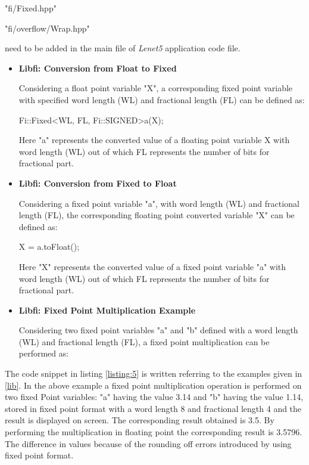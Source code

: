 \noindent "fi/Fixed.hpp"

\noindent "fi/overflow/Wrap.hpp"

\noindent need to be added in the main file of \textit{Lenet5} application code file.
\begin{itemize}
\item
\textbf{Libfi: Conversion from Float to Fixed}

\noindent Considering a float point variable "X", a corresponding fixed point variable with specified word length (WL) and fractional length (FL) can be defined as:

\hspace{3cm}Fi::Fixed\textless WL, FL, Fi::SIGNED\textgreater a(X);

\noindent Here "a" represents the converted value of a floating point variable X with word length (WL) out of which FL represents the number of bits for fractional part.
\item
\textbf{Libfi: Conversion from Fixed to Float}

\noindent Considering a fixed point variable "a", with word length (WL) and fractional length (FL), the corresponding floating point converted variable "X" can be defined as:

\hspace{3cm}X = a.toFloat();

\noindent Here "X" represents the converted value of a fixed point variable "a" with word length (WL) out of which FL represents the number of bits for fractional part.
\item
\textbf{Libfi: Fixed Point Multiplication Example}

\noindent Considering two fixed point variables "a" and "b" defined with a word length (WL) and fractional length (FL), a fixed point multiplication can be performed as:


\end{itemize}
\noindent The code snippet in listing \ref{listing:5} is written referring to the examples given in \ref{lib}. In the above example a fixed point multiplication operation is performed on two fixed Point variables: "a" having the value 3.14 and "b" having the value 1.14, stored in fixed point format with a word length 8 and fractional length 4 and the result is displayed on screen. The corresponding result obtained is 3.5. By performing the multiplication in floating point the corresponding result is 3.5796. The difference in values because of the rounding off errors introduced by using fixed point format. 


